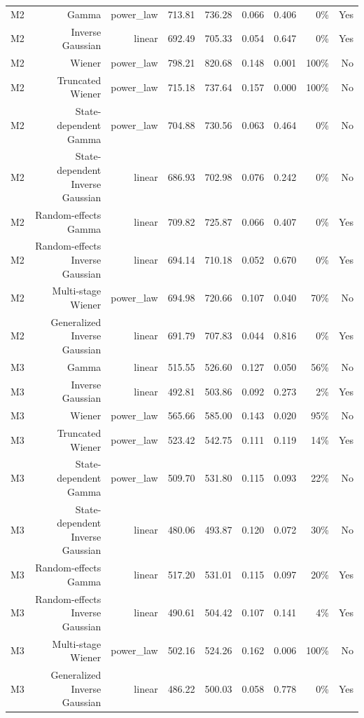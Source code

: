 \begin{table}[t]
\begin{tabular}{lrrrrrrrr}
M2 & Gamma & power\_law & 713.81 & 736.28 & 0.066 & 0.406 & 0\% & Yes \\
M2 & Inverse Gaussian & linear & 692.49 & 705.33 & 0.054 & 0.647 & 0\% & Yes \\
M2 & Wiener & power\_law & 798.21 & 820.68 & 0.148 & 0.001 & 100\% & No \\
M2 & Truncated Wiener & power\_law & 715.18 & 737.64 & 0.157 & 0.000 & 100\% & No \\
M2 & State-dependent Gamma & power\_law & 704.88 & 730.56 & 0.063 & 0.464 & 0\% & No \\
M2 & State-dependent Inverse Gaussian & linear & 686.93 & 702.98 & 0.076 & 0.242 & 0\% & No \\
M2 & Random-effects Gamma & linear & 709.82 & 725.87 & 0.066 & 0.407 & 0\% & Yes \\
M2 & Random-effects Inverse Gaussian & linear & 694.14 & 710.18 & 0.052 & 0.670 & 0\% & Yes \\
M2 & Multi-stage Wiener & power\_law & 694.98 & 720.66 & 0.107 & 0.040 & 70\% & No \\
M2 & Generalized Inverse Gaussian & linear & 691.79 & 707.83 & 0.044 & 0.816 & 0\% & Yes \\
M3 & Gamma & linear & 515.55 & 526.60 & 0.127 & 0.050 & 56\% & No \\
M3 & Inverse Gaussian & linear & 492.81 & 503.86 & 0.092 & 0.273 & 2\% & Yes \\
M3 & Wiener & power\_law & 565.66 & 585.00 & 0.143 & 0.020 & 95\% & No \\
M3 & Truncated Wiener & power\_law & 523.42 & 542.75 & 0.111 & 0.119 & 14\% & Yes \\
M3 & State-dependent Gamma & power\_law & 509.70 & 531.80 & 0.115 & 0.093 & 22\% & No \\
M3 & State-dependent Inverse Gaussian & linear & 480.06 & 493.87 & 0.120 & 0.072 & 30\% & No \\
M3 & Random-effects Gamma & linear & 517.20 & 531.01 & 0.115 & 0.097 & 20\% & Yes \\
M3 & Random-effects Inverse Gaussian & linear & 490.61 & 504.42 & 0.107 & 0.141 & 4\% & Yes \\
M3 & Multi-stage Wiener & power\_law & 502.16 & 524.26 & 0.162 & 0.006 & 100\% & No \\
M3 & Generalized Inverse Gaussian & linear & 486.22 & 500.03 & 0.058 & 0.778 & 0\% & Yes \\
\bottomrule
\end{tabular}
\end{table}
